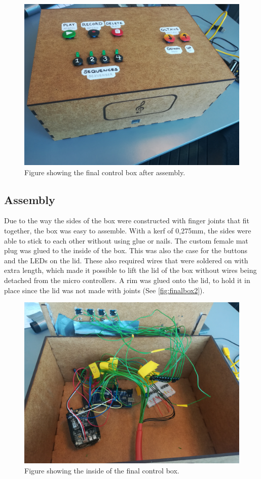 	
	\begin{figure}[H]
		\centering
		\includegraphics[width=0.9\linewidth]{figure/Implementation/boxFront}
		\caption{Figure showing the final control box after assembly.}
		\label{fig:finalbox1}
	\end{figure}
	
		
	\subsection{Assembly}
	Due to the way the sides of the box were constructed with finger joints that fit together, the box was easy to assemble. With a kerf of 0,275mm, the sides were able to stick to each other without using glue or nails. The custom female mat plug was glued to the inside of the box. This was also the case for the buttons and the LEDs on the lid. These also required wires that were soldered on with extra length, which made it possible to lift the lid of the box without wires being detached from the micro controllers. A rim was glued onto the lid, to hold it in place since the lid was not made with joints (See \autoref{fig:finalbox2}).
	
	\begin{figure}[H]
		\centering
		\includegraphics[width=0.9\linewidth]{figure/Implementation/boxInside}
		\caption{Figure showing the inside of the final control box.}
		\label{fig:finalbox2}
	\end{figure}

